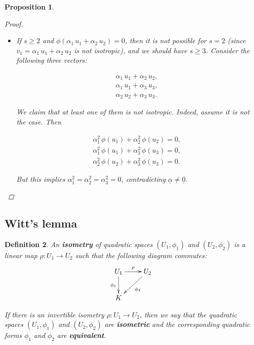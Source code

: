 \documentclass{article}
\newcommand{\term}{\textbf}
\theoremstyle{myplain}
\newtheorem{proposition}{Proposition}[section]
\theoremstyle{mydefinition}
\newtheorem{definition}[proposition]{Definition}
\begin{document}
\begin{proposition}
\begin{proof}
\begin{itemize}
    So we take $\beta_1 = \alpha_2 \, \phi (u_2)$ and
    $\beta_2 = -\alpha_1 \, \phi (u_1)$. We have $(\beta_1, \beta_2) \ne (0,0)$
    since
    $\phi (\alpha_1\,u_1 + \alpha_2\,u_2) = \alpha_1^2 \, \phi (u_1) + \alpha_2^2 \, \phi (u_2) \ne 0$.

    Consider a new basis $u_1^\prime, u_2^\prime, u_3, \ldots, u_n$. We have
    $v_1 = u_1^\prime + \alpha_3 \, u_3 + \cdots + \alpha_s \, u_s$, a linear
    combination of $s-1$ vectors. So we reduced $s$ to $s-1$, and we can use
    induction.

  \item If $s \ge 2$ and $\phi (\alpha_1 \, u_1 + \alpha_2 \, u_2) = 0$, then it
    is not possible for $s = 2$ (since $v_1 = \alpha_1 \, u_1 + \alpha_2 \, u_2$
    is not isotropic), and we should have $s \ge 3$. Consider the following
    three vectors:

    \begin{gather*}
      \alpha_1 \, u_1 + \alpha_2 \, u_2,\\
      \alpha_1 \, u_1 + \alpha_3 \, u_3,\\
      \alpha_2 \, u_2 + \alpha_3 \, u_3.
    \end{gather*}

    We claim that at least one of them is not isotropic. Indeed, assume it is
    not the case. Then

    \begin{gather*}
      \alpha_1^2 \, \phi (u_1) + \alpha_2^2 \, \phi (u_2) = 0,\\
      \alpha_1^2 \, \phi (u_1) + \alpha_3^2 \, \phi (u_3) = 0,\\
      \alpha_2^2 \, \phi (u_2) + \alpha_3^2 \, \phi (u_3) = 0.
    \end{gather*}

    But this implies $\alpha_1^2 = \alpha_2^2 = \alpha_3^2 = 0$, contradicting
    $\underline{\alpha} \ne \underline{0}$. \qedhere
  \end{itemize}
\end{proof}
\end{proposition}

\subsection*{Witt's lemma}

\begin{definition}
  An \term{isometry} of quadratic spaces $(U_1,\phi_1)$ and $(U_2,\phi_2)$ is a
  linear map $\rho\colon U_1 \to U_2$ such that the following diagram commutes:
  \[ \xymatrix{
      U_1\ar[r]^\rho\ar[d]_{\phi_1} & U_2\ar[dl]^{\phi_2} \\
      K
    } \]

  If there is an invertible isometry $\rho\colon U_1\to U_2$, then we say that
  the quadratic spaces $(U_1,\phi_1)$ and $(U_2,\phi_2)$ are \term{isometric}
  and the corresponding quadratic forms $\phi_1$ and $\phi_2$ are
  \term{equivalent}.
\end{definition}
\end{document}
